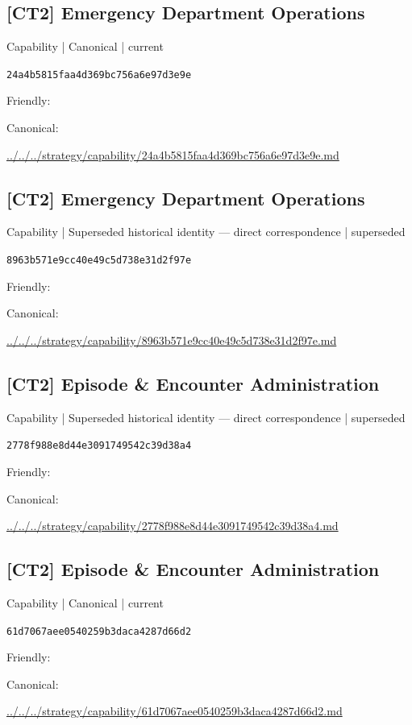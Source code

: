 \documentclass[10pt,a4paper]{article}
\begin{document}
\subsection*{[CT2] Emergency Department Operations}
{\small Capability | Canonical | current}\par
\texttt{24a4b5815faa4d369bc756a6e97d3e9e}\par
Friendly: \par
Canonical: \par
{\footnotesize\url{../../../strategy/capability/24a4b5815faa4d369bc756a6e97d3e9e.md}}\par
\subsection*{[CT2] Emergency Department Operations}
{\small Capability | Superseded historical identity — direct correspondence | superseded}\par
\texttt{8963b571e9cc40e49c5d738e31d2f97e}\par
Friendly: \par
Canonical: \par
{\footnotesize\url{../../../strategy/capability/8963b571e9cc40e49c5d738e31d2f97e.md}}\par
\subsection*{[CT2] Episode \& Encounter Administration}
{\small Capability | Superseded historical identity — direct correspondence | superseded}\par
\texttt{2778f988e8d44e3091749542c39d38a4}\par
Friendly: \par
Canonical: \par
{\footnotesize\url{../../../strategy/capability/2778f988e8d44e3091749542c39d38a4.md}}\par
\subsection*{[CT2] Episode \& Encounter Administration}
{\small Capability | Canonical | current}\par
\texttt{61d7067aee0540259b3daca4287d66d2}\par
Friendly: \par
Canonical: \par
{\footnotesize\url{../../../strategy/capability/61d7067aee0540259b3daca4287d66d2.md}}\par
\end{document}
